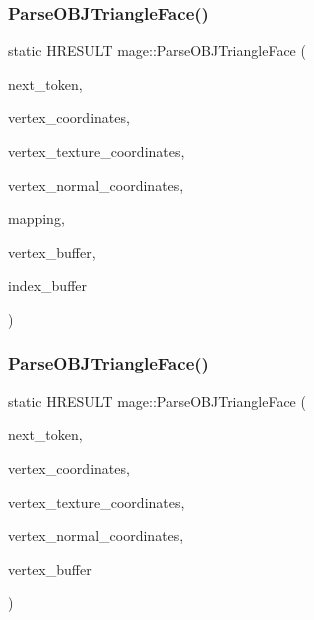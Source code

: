 \hypertarget{namespacemage_a2933dd3937569d4dfaa1483a1917d2b8}{}\label{namespacemage_a2933dd3937569d4dfaa1483a1917d2b8} 
\subsubsection{\texorpdfstring{Parse\+O\+B\+J\+Triangle\+Face()}{ParseOBJTriangleFace()}\hspace{0.1cm}{\footnotesize\ttfamily [1/2]}}
{\footnotesize\ttfamily static H\+R\+E\+S\+U\+LT mage\+::\+Parse\+O\+B\+J\+Triangle\+Face (\begin{DoxyParamCaption}\item[{char $\ast$$\ast$}]{next\+\_\+token,  }\item[{vector$<$ X\+M\+F\+L\+O\+A\+T3 $>$ \&}]{vertex\+\_\+coordinates,  }\item[{vector$<$ X\+M\+F\+L\+O\+A\+T2 $>$ \&}]{vertex\+\_\+texture\+\_\+coordinates,  }\item[{vector$<$ X\+M\+F\+L\+O\+A\+T3 $>$ \&}]{vertex\+\_\+normal\+\_\+coordinates,  }\item[{map$<$ X\+M\+U\+I\+N\+T3, uint32\+\_\+t, \hyperlink{structmage_1_1_o_b_j_comparator_x_m_u_i_n_t3}{O\+B\+J\+Comparator\+X\+M\+U\+I\+N\+T3} $>$ \&}]{mapping,  }\item[{vector$<$ \hyperlink{structmage_1_1_vertex}{Vertex} $>$ \&}]{vertex\+\_\+buffer,  }\item[{vector$<$ uint32\+\_\+t $>$ \&}]{index\+\_\+buffer }\end{DoxyParamCaption})\hspace{0.3cm}{\ttfamily [static]}}

\hypertarget{namespacemage_a4a7430df49be0a35ff43909784387506}{}\label{namespacemage_a4a7430df49be0a35ff43909784387506} 
\subsubsection{\texorpdfstring{Parse\+O\+B\+J\+Triangle\+Face()}{ParseOBJTriangleFace()}\hspace{0.1cm}{\footnotesize\ttfamily [2/2]}}
{\footnotesize\ttfamily static H\+R\+E\+S\+U\+LT mage\+::\+Parse\+O\+B\+J\+Triangle\+Face (\begin{DoxyParamCaption}\item[{char $\ast$$\ast$}]{next\+\_\+token,  }\item[{vector$<$ X\+M\+F\+L\+O\+A\+T3 $>$ \&}]{vertex\+\_\+coordinates,  }\item[{vector$<$ X\+M\+F\+L\+O\+A\+T2 $>$ \&}]{vertex\+\_\+texture\+\_\+coordinates,  }\item[{vector$<$ X\+M\+F\+L\+O\+A\+T3 $>$ \&}]{vertex\+\_\+normal\+\_\+coordinates,  }\item[{vector$<$ \hyperlink{structmage_1_1_vertex}{Vertex} $>$ \&}]{vertex\+\_\+buffer }\end{DoxyParamCaption})\hspace{0.3cm}{\ttfamily [static]}}

